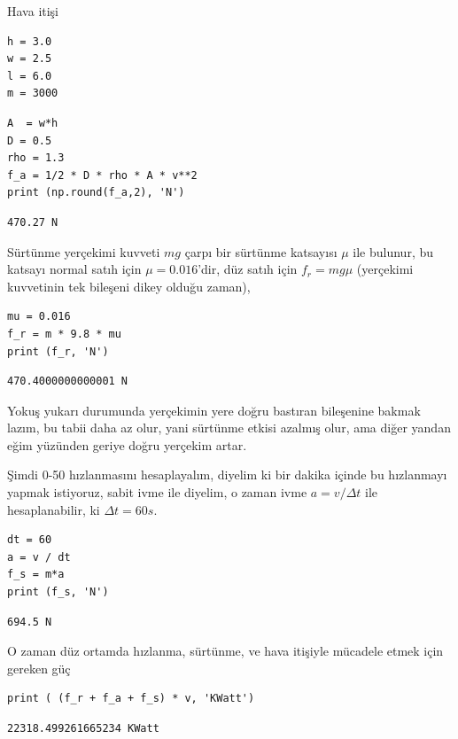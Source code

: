 \documentclass[12pt,fleqn]{article}\usepackage{../../common}
\begin{document}
Hava itişi

\begin{verbatim}
h = 3.0
w = 2.5
l = 6.0
m = 3000
\end{verbatim}

\begin{verbatim}
A  = w*h
D = 0.5
rho = 1.3
f_a = 1/2 * D * rho * A * v**2
print (np.round(f_a,2), 'N')
\end{verbatim}

\begin{verbatim}
470.27 N
\end{verbatim}

Sürtünme yerçekimi kuvveti $mg$ çarpı bir sürtünme katsayısı $\mu$ ile bulunur,
bu katsayı normal satıh için $\mu = 0.016$'dir, düz satıh için $f_r = m g \mu$
(yerçekimi kuvvetinin tek bileşeni dikey olduğu zaman),

\begin{verbatim}
mu = 0.016
f_r = m * 9.8 * mu
print (f_r, 'N')
\end{verbatim}

\begin{verbatim}
470.4000000000001 N
\end{verbatim}

Yokuş yukarı durumunda yerçekimin yere doğru bastıran bileşenine bakmak lazım,
bu tabii daha az olur, yani sürtünme etkisi azalmış olur, ama diğer yandan eğim
yüzünden geriye doğru yerçekim artar.

Şimdi 0-50 hızlanmasını hesaplayalım, diyelim ki bir dakika içinde bu hızlanmayı
yapmak istiyoruz, sabit ivme ile diyelim, o zaman ivme $a = v / \Delta t$ ile
hesaplanabilir, ki $\Delta t = 60 s$.

\begin{verbatim}
dt = 60
a = v / dt
f_s = m*a
print (f_s, 'N')
\end{verbatim}

\begin{verbatim}
694.5 N
\end{verbatim}

O zaman düz ortamda hızlanma, sürtünme, ve hava itişiyle mücadele etmek için
gereken güç

\begin{verbatim}
print ( (f_r + f_a + f_s) * v, 'KWatt')
\end{verbatim}

\begin{verbatim}
22318.499261665234 KWatt
\end{verbatim}
\end{document}
